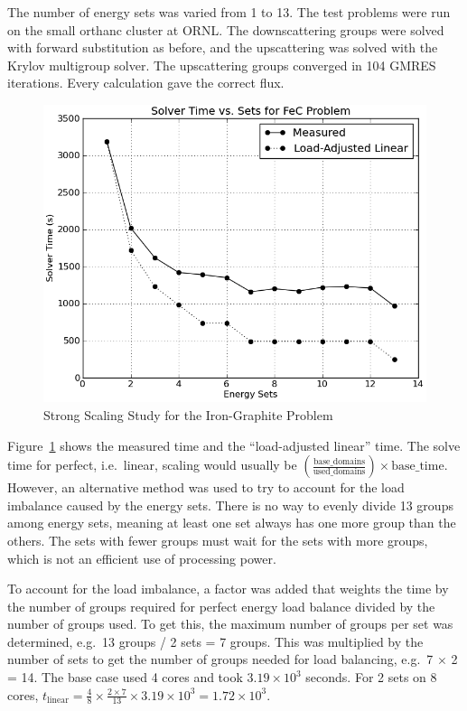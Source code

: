 The number of energy sets was varied from 1 to 13. The test problems were run on the small orthanc cluster at ORNL.  The downscattering groups were solved with forward substitution as before, and the upscattering was solved with the Krylov multigroup solver. The upscattering groups converged in 104 GMRES iterations. Every calculation gave the correct flux.

\begin{figure}[!h]
  \begin{center}
    \includegraphics [width=.75\textwidth, height=0.45\textheight ] {FeCKrylovMultisets}
  \end{center}
  \caption{Strong Scaling Study for the Iron-Graphite Problem}
  \label{fig:FeGraphiteStudy}
\end{figure}
%
Figure~\ref{fig:FeGraphiteStudy} shows the measured time and the ``load-adjusted linear'' time. The solve time for perfect, i.e.\ linear, scaling would usually be $(\frac{\text{base\_domains}}{\text{used\_domains}}) \times \text{base\_time}$. However, an alternative method was used to try to account for the load imbalance caused by the energy sets. There is no way to evenly divide 13 groups among energy sets, meaning at least one set always has one more group than the others. The sets with fewer groups must wait for the sets with more groups, which is not an efficient use of processing power. 

To account for the load imbalance, a factor was added that weights the time by the number of groups required for perfect energy load balance divided by the number of groups used. To get this, the maximum number of groups per set was determined, e.g.\ 13 groups / 2 sets = 7 groups. This was multiplied by the number of sets to get the number of groups needed for load balancing, e.g.\ 7 $\times$ 2 = 14. The base case used 4 cores and took $3.19 \times 10^{3}$ seconds. For 2 sets on 8 cores, $t_{\text{linear}} = \frac{4}{8}\times\frac{2\times7}{13} \times 3.19 \times 10^{3} = 1.72 \times 10^{3}$.

